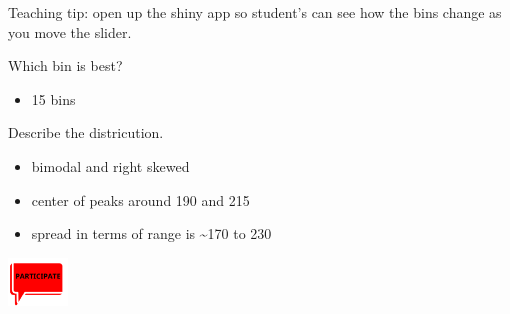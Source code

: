\documentclass[
  letterpaper,
  DIV=11,
  numbers=noendperiod]{scrreprt}
\providecommand{\tightlist}{%
  \setlength{\itemsep}{0pt}\setlength{\parskip}{0pt}}\usepackage{longtable,booktabs,array}
\begin{document}
\begin{tcolorbox}[enhanced jigsaw, breakable, colback=white, bottomrule=.15mm, leftrule=.75mm, colframe=quarto-callout-important-color-frame, arc=.35mm, rightrule=.15mm, toprule=.15mm, left=2mm, opacityback=0]

Teaching tip: open up the shiny app so student's can see how the bins
change as you move the slider.

Which bin is best?

\begin{itemize}
\tightlist
\item
  15 bins
\end{itemize}

Describe the districution.

\begin{itemize}
\tightlist
\item
  bimodal and right skewed
\item
  center of peaks around 190 and 215
\item
  spread in terms of range is \textasciitilde170 to 230
\end{itemize}

\includegraphics[width=\textwidth,height=0.5in]{images/images_lecture/participate_icon.png}

\end{tcolorbox}
\end{document}

